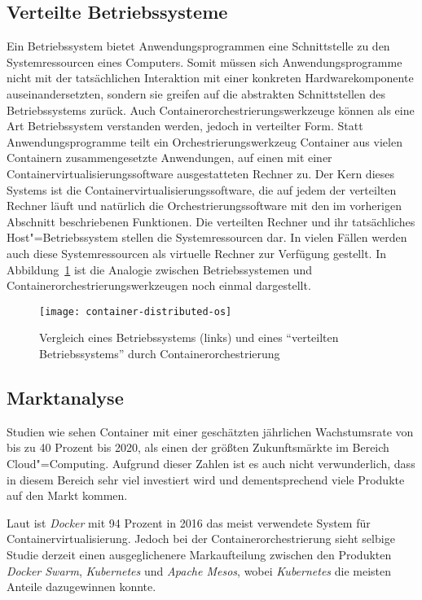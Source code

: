\subsection{Verteilte Betriebssysteme}

Ein Betriebssystem bietet Anwendungsprogrammen eine Schnittstelle zu den Systemressourcen eines Computers. Somit müssen sich Anwendungsprogramme nicht mit der tatsächlichen Interaktion mit einer konkreten Hardwarekomponente auseinandersetzten, sondern sie greifen auf die abstrakten Schnittstellen des Betriebssystems zurück. Auch Containerorchestrierungswerkzeuge können als eine Art Betriebssystem verstanden werden, jedoch in verteilter Form. Statt Anwendungsprogramme teilt ein Orchestrierungswerkzeug Container \bzw aus vielen Containern zusammengesetzte Anwendungen, auf einen mit einer Containervirtualisierungssoftware ausgestatteten Rechner zu. Der Kern dieses Systems ist die Containervirtualisierungssoftware, die auf jedem der verteilten Rechner läuft und natürlich die Orchestrierungssoftware mit den im vorherigen Abschnitt beschriebenen Funktionen. Die verteilten Rechner und ihr tatsächliches Host"=Betriebssystem stellen die Systemressourcen dar. In vielen Fällen werden auch diese Systemressourcen als virtuelle Rechner zur Verfügung gestellt. In Abbildung~\ref{fig:container-distributed-os} ist die Analogie zwischen Betriebssystemen und Containerorchestrierungswerkzeugen noch einmal dargestellt.

\begin{figure}[!hbt]%
\centering
\texttt{[image: container-distributed-os]}%
\caption{Vergleich eines Betriebssystems (links) und eines "`verteilten Betriebssystems"' durch Containerorchestrierung}%
\label{fig:container-distributed-os}%
\end{figure}

\subsection{Marktanalyse}

Studien wie \cite{ContainerMarketGrowth} sehen Container mit einer geschätzten jährlichen Wachstumsrate von bis zu 40 Prozent bis 2020, als einen der größten Zukunftsmärkte im Bereich Cloud"=Computing. Aufgrund dieser Zahlen ist es auch nicht verwunderlich, dass in diesem Bereich sehr viel investiert wird und dementsprechend viele Produkte auf den Markt kommen. 

Laut \cite{ContainerMarketReport} ist \textit{Docker} mit 94 Prozent in 2016 das meist verwendete System für Containervirtualisierung. Jedoch bei der Containerorchestrierung sieht selbige Studie derzeit einen ausgeglichenere Markaufteilung zwischen den Produkten \textit{Docker Swarm}, \textit{Kubernetes} und \textit{Apache Mesos}, wobei \textit{Kubernetes} die meisten Anteile dazugewinnen konnte.

